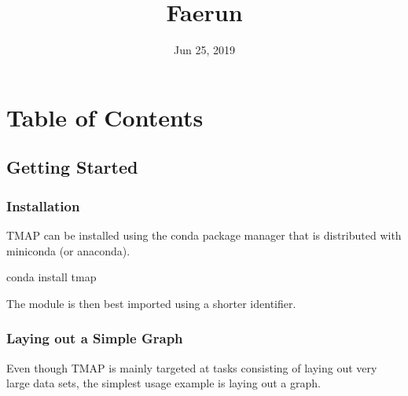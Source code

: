 \documentclass[letterpaper,10pt,english]{sphinxmanual}
\title{Faerun}
\date{Jun 25, 2019}
\author{}
\begin{document}
\pagestyle{empty}
\sphinxmaketitle
\pagestyle{plain}
\sphinxtableofcontents
\pagestyle{normal}
\label{\detokenize{index::doc}}



\chapter{Table of Contents}
\label{\detokenize{index:table-of-contents}}

\section{Getting Started}
\label{\detokenize{tutorial:getting-started}}\label{\detokenize{tutorial::doc}}

\subsection{Installation}
\label{\detokenize{tutorial:installation}}
TMAP can be installed using the conda package manager that
is distributed with miniconda (or anaconda).

\begin{sphinxVerbatim}[commandchars=\\\{\}]
conda install tmap
\end{sphinxVerbatim}

The module is then best imported using a shorter identifier.

\begin{sphinxVerbatim}[commandchars=\\\{\}]
   
\end{sphinxVerbatim}


\subsection{Laying out a Simple Graph}
\label{\detokenize{tutorial:laying-out-a-simple-graph}}
Even though TMAP is mainly targeted at tasks consisting of
laying out very large data sets, the simplest usage example
is laying out a graph.
\end{document}
